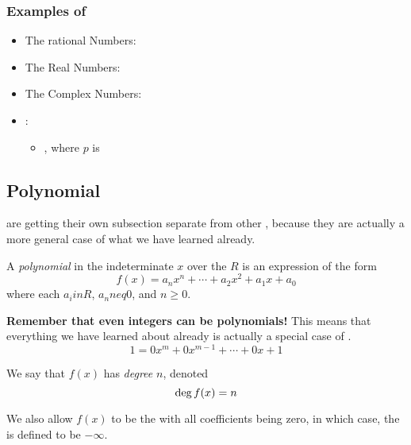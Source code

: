 \subsubsection{Examples of }\label{subsubsec:Examples_of_Fields}
\begin{itemize}[noitemsep]
\item The rational Numbers: \TextRationalNumbers{}
\item The Real Numbers: \TextRealNumbers{}
\item The Complex Numbers: \TextComplexNumbers{}
\item {}:
  \begin{itemize}[noitemsep]
  \item {}, where $p$ is 
  \end{itemize}
\end{itemize}

\subsection{Polynomial }\label{subsec:Polynomial_Rings}
 are getting their own subsection separate from other , because they are actually a more general case of what we have learned already.
\begin{definition}[Polynomial]\label{def:Polynomial}
  A \emph{polynomial} in the indeterminate $x$ over the  $R$ is an expression of the form
  \begin{equation}\label{eq:Polynomial_Ring}
    f(x) = a_{n}x^{n} + \cdots + a_{2}x^{2} + a_{1}x + a_{0}
  \end{equation}
  where each $a_{i} in R$, $a_{n} neq 0$, and $n \geq 0$.

  \begin{remark}
    \textbf{Remember that even integers can be polynomials!}
    This means that everything we have learned about  already is actually a special case of .
    \begin{equation*}
      1 = 0x^{m} + 0x^{m-1} + \cdots + 0x + 1
    \end{equation*}
  \end{remark}
\end{definition}

\begin{definition}[Degree]\label{def:Polynomial_Degree}
  We say that $f(x)$ has \emph{degree} $n$, denoted
  \begin{equation}\label{eq:Polynomial_Degree}
    \operatorname{\text{deg}} f(x) = n
  \end{equation}

  \begin{remark}
    We also allow $f(x)$ to be the  with all coefficients being zero, in which case, the  is defined to be $-\infty$.
  \end{remark}
\end{definition}


